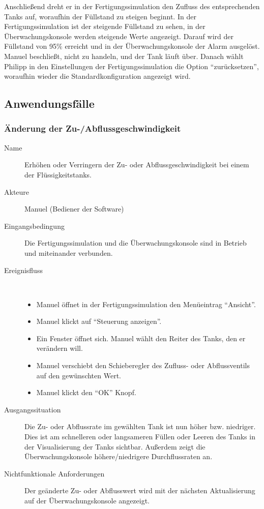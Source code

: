 \documentclass[parskip=full]{scrartcl}
\begin{document}
Anschlie{\ss}end dreht er in der Fertigungssimulation den Zufluss des entsprechenden Tanks auf, woraufhin der F\"ullstand
zu steigen beginnt. In der Fertigungssimulation ist der steigende F\"ullstand zu sehen, in der \"Uberwachungskonsole werden
steigende Werte angezeigt.
Darauf wird der F\"ullstand von 95\% erreicht und in der \"Uberwachungskonsole der Alarm ausgel\"ost. Manuel
beschlie{\ss}t, nicht zu handeln, und der Tank l\"auft \"uber. Danach w\"ahlt Philipp in den Einstellungen der
Fertigungssimulation die Option "`zur\"ucksetzen"', woraufhin wieder die Standardkonfiguration angezeigt wird.

\subsection{Anwendungsfälle}
\subsubsection{Änderung der Zu-/Abflussgeschwindigkeit}
\begin{description}
 \item[Name] Erhöhen oder Verringern der Zu- oder Abflussgeschwindigkeit bei einem der Flüssigkeitstanks.
 \item[Akteure] Manuel (Bediener der Software)
 \item[Eingangsbedingung] Die Fertigungssimulation und die Überwachungskonsole sind in Betrieb und miteinander verbunden.
 \item[Ereignisfluss]~\\
 \begin{itemize}[noitemsep]
  \item Manuel öffnet in der Fertigungssimulation den Menüeintrag "`Ansicht"'.
  \item Manuel klickt auf "`Steuerung anzeigen"'.
  \item Ein Fenster öffnet sich. Manuel wählt den Reiter des Tanks, den er verändern will.
  \item Manuel verschiebt den Schieberegler des Zufluss- oder Abflussventils auf den gewünschten Wert.
  \item Manuel klickt den "`OK"' Knopf.
 \end{itemize}
 \item[Ausgangssituation] Die Zu- oder Abflussrate im gewählten Tank ist nun höher bzw. niedriger. Dies ist am schnelleren oder langsameren Füllen oder Leeren des Tanks in der Visualisierung der Tanks sichtbar.
 Außerdem zeigt die Überwachungskonsole höhere/niedrigere Durchflussraten an.
 \item [Nichtfunktionale Anforderungen] Der geänderte Zu- oder Abflusswert wird mit der nächsten Aktualisierung auf der Überwachungskonsole angezeigt.
\end{description}
\end{document}
